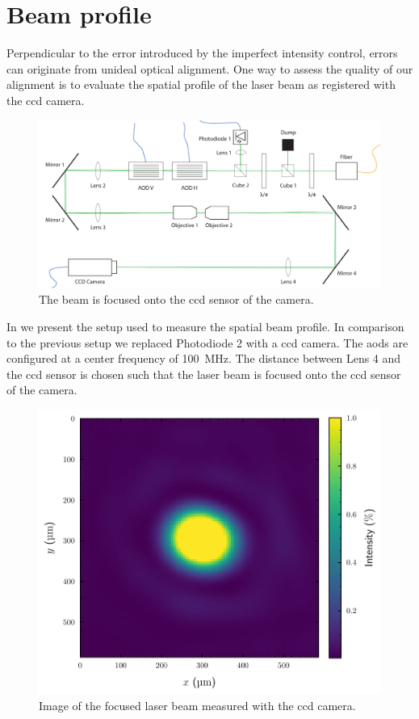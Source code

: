 \section{Beam profile}

Perpendicular to the error introduced by the imperfect intensity control,
errors can originate from unideal optical alignment. One way to assess the
quality of our alignment is to evaluate the spatial profile of the laser beam
as registered with the \gls{ccd} camera.
\begin{figure}[htb]
  \centering
  \includegraphics[width=\textwidth]{../media/setup/intensity-profile.pdf}
  \caption{The beam is focused onto the \gls{ccd} sensor of the camera.
  }\label{fig:intensity_profile_setup}
\end{figure}
In  we present the setup used to measure
the spatial beam profile. In comparison to the previous setup we replaced
Photodiode 2 with a \gls{ccd} camera. The \gls{aod}s are configured at a
center frequency of \SI{100}{\mega\hertz}. The distance between Lens 4 and
the \gls{ccd} sensor is chosen such that the laser beam is focused onto the
\gls{ccd} sensor of the camera.
\begin{figure}[htb]
  \centering
  \includegraphics[width=.6\textwidth]
  {../figure/intensity/profile/image.pdf}
  \caption{Image of the focused laser beam measured with the \gls{ccd} camera.
  }\label{fig:intensity_spatial_image}
\end{figure}
